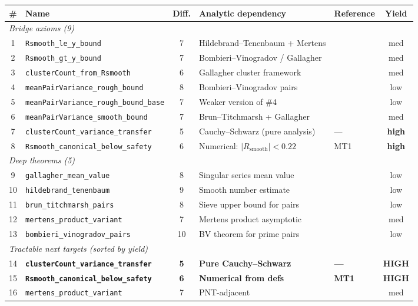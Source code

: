 \documentclass[11pt,a4paper]{article}
\begin{document}
\begin{center}
\small
\begin{tabular}{@{}clcllc@{}}
\toprule
\textbf{\#} & \textbf{Name} & \textbf{Diff.} & \textbf{Analytic dependency} & \textbf{Reference} & \textbf{Yield} \\
\midrule
\multicolumn{6}{l}{\textit{\color{stubbed} Bridge axioms (9)}} \\
1 & \texttt{Rsmooth\_le\_y\_bound} & 7 & Hildebrand--Tenenbaum + Mertens & \cite{HT86} & med \\
2 & \texttt{Rsmooth\_gt\_y\_bound} & 7 & Bombieri--Vinogradov / Gallagher & \cite{BV,Gal76} & med \\
3 & \texttt{clusterCount\_from\_Rsmooth} & 6 & Gallagher cluster framework & \cite{Gal76} & med \\
4 & \texttt{meanPairVariance\_rough\_bound} & 8 & Bombieri--Vinogradov pairs & \cite{BV} & low \\
5 & \texttt{meanPairVariance\_rough\_bound\_base} & 7 & Weaker version of \#4 & \cite{BV} & low \\
6 & \texttt{meanPairVariance\_smooth\_bound} & 7 & Brun--Titchmarsh + Gallagher & \cite{BT,Gal76} & med \\
7 & \texttt{clusterCount\_variance\_transfer} & 5 & Cauchy--Schwarz (pure analysis) & --- & \textbf{high} \\
8 & \texttt{Rsmooth\_canonical\_below\_safety} & 6 & Numerical: $|\!R_{\text{smooth}}| < 0.22$ & MT1 & \textbf{high} \\
\midrule
\multicolumn{6}{l}{\textit{\color{deep} Deep theorems (5)}} \\
9 & \texttt{gallagher\_mean\_value} & 8 & Singular series mean value & \cite{Gal76} & low \\
10 & \texttt{hildebrand\_tenenbaum} & 9 & Smooth number estimate & \cite{HT86} & low \\
11 & \texttt{brun\_titchmarsh\_pairs} & 8 & Sieve upper bound for pairs & \cite{BT} & low \\
12 & \texttt{mertens\_product\_variant} & 7 & Mertens product asymptotic & \cite{Mertens} & med \\
13 & \texttt{bombieri\_vinogradov\_pairs} & 10 & BV theorem for prime pairs & \cite{BV} & low \\
\midrule
\multicolumn{6}{l}{\textit{Tractable next targets (sorted by yield)}} \\
14 & \textbf{\texttt{clusterCount\_variance\_transfer}} & \textbf{5} & \textbf{Pure Cauchy--Schwarz} & \textbf{---} & \textbf{HIGH} \\
15 & \textbf{\texttt{Rsmooth\_canonical\_below\_safety}} & \textbf{6} & \textbf{Numerical from defs} & \textbf{MT1} & \textbf{HIGH} \\
16 & \texttt{mertens\_product\_variant} & 7 & PNT-adjacent & \cite{Mertens} & med \\
\bottomrule
\end{tabular}
\end{center}
\end{document}
